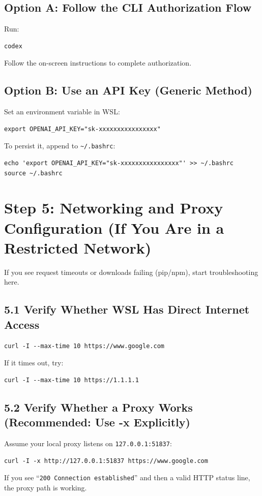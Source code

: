 \documentclass[11pt,a4paper]{article}
\begin{document}
\subsection{Option A: Follow the CLI Authorization Flow}
Run:
\begin{lstlisting}
codex
\end{lstlisting}
Follow the on-screen instructions to complete authorization.

\subsection{Option B: Use an API Key (Generic Method)}
Set an environment variable in WSL:
\begin{lstlisting}
export OPENAI_API_KEY="sk-xxxxxxxxxxxxxxxx"
\end{lstlisting}
To persist it, append to \texttt{\textasciitilde/.bashrc}:
\begin{lstlisting}
echo 'export OPENAI_API_KEY="sk-xxxxxxxxxxxxxxxx"' >> ~/.bashrc
source ~/.bashrc
\end{lstlisting}

\section{Step 5: Networking and Proxy Configuration (If You Are in a Restricted Network)}
\label{sec:proxy}
If you see request timeouts or downloads failing (pip/npm), start troubleshooting here.

\subsection{5.1 Verify Whether WSL Has Direct Internet Access}
\begin{lstlisting}
curl -I --max-time 10 https://www.google.com
\end{lstlisting}
If it times out, try:
\begin{lstlisting}
curl -I --max-time 10 https://1.1.1.1
\end{lstlisting}

\subsection{5.2 Verify Whether a Proxy Works (Recommended: Use -x Explicitly)}
Assume your local proxy listens on \texttt{127.0.0.1:51837}:
\begin{lstlisting}
curl -I -x http://127.0.0.1:51837 https://www.google.com
\end{lstlisting}
If you see ``\texttt{200 Connection established}'' and then a valid HTTP status line, the proxy path is working.
\end{document}
